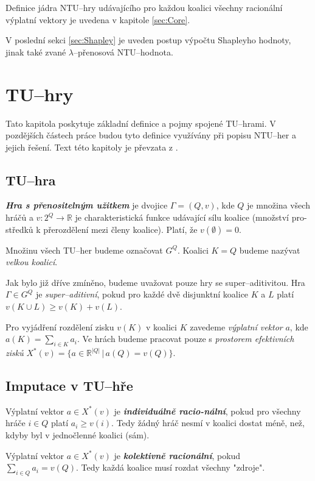     Definice jádra NTU--hry udávajícího pro každou koalici všechny racionální výplatní vektory je uvedena v kapitole \ref{sec:Core}.

    V poslední sekci \ref{sec:Shapley} je uveden postup výpočtu Shapleyho hodnoty, jinak také zvané $\lambda$--přenosová NTU--hodnota.


\section{TU--hry}
    \label{sec:TU}
    Tato kapitola poskytuje základní definice a pojmy spojené TU--hrami. V pozdějších částech práce budou tyto definice využívány při popisu NTU--her a jejich řešení. Text této kapitoly je převzata z \cite{Hruby2022}.

    \subsection{TU--hra}
        \textit{\textbf{Hra s přenositelným užitkem}} je dvojice $\Gamma = (Q, v)$, kde $Q$ je množina všech hráčů a $v: 2^Q \rightarrow \mathbb{R}$ je charakteristická funkce udávající sílu koalice (množství pro-středků k přerozdělení mezi členy koalice). Platí, že $v(\emptyset) = 0$.

        Množinu všech TU--her budeme označovat $G^Q$. Koalici $K = Q$ budeme nazývat \textit{velkou koalicí}.

        Jak bylo již dříve zmíněno, budeme uvažovat pouze hry se super--aditivitou. Hra $\Gamma \in G^Q$ je \textit{super--aditivní}, pokud pro každé dvě disjunktní koalice $K$ a $L$ platí $v(K \cup L) \geq v(K) + v(L)$.

        Pro vyjádření rozdělení zisku $v(K)$ v koalici $K$ zavedeme \textit{výplatní vektor} $a$, kde $a(K) = \sum_{i\in K}a_i$. Ve hrách budeme pracovat pouze s \textit{prostorem efektivních zisků} $X^*(v) = \{a \in \mathbb{R}^{|Q|}\,|\,a(Q) = v(Q)\}$.

    \subsection{Imputace v TU--hře}
        Výplatní vektor $a \in X^*(v)$ je \textit{\textbf{individuálně racio-nální}}, pokud pro všechny hráče $i \in Q$ platí $a_i \geq v({i})$. Tedy žádný hráč nesmí v koalici dostat méně, než, kdyby byl v jednočlenné koalici (sám).

        Výplatní vektor $a \in X^*(v)$ je \textit{\textbf{kolektivně racionální}}, pokud $\sum_{i \in Q}a_i = v(Q)$. Tedy každá koalice musí rozdat všechny "zdroje".

